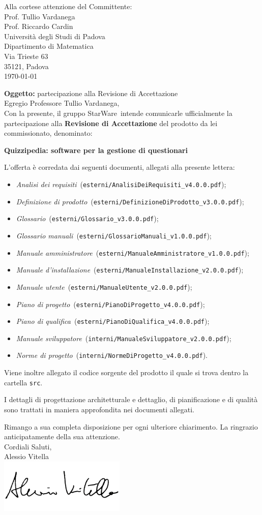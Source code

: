 \documentclass[12pt,a4paper]{article}
\title{\titoloDocumento}
\newcommand{\nomeGruppo}{StarWare}
\newcommand{\uni}{Universit\`{a} degli Studi di Padova}
\newcommand{\Cardin}{Prof. Riccardo Cardin}
\newcommand{\Vardanega}{Prof. Tullio Vardanega}
\newcommand{\prjL}{Quizzipedia: software per la gestione di questionari}
\newcommand{\AVI}{Alessio Vitella}
\newcommand{\NdP}{\emph{Norme di progetto}}
\newcommand{\AdR}{\emph{Analisi dei requisiti}}
\newcommand{\PdP}{\emph{Piano di progetto}}
\newcommand{\PdQ}{\emph{Piano di qualifica}}
\newcommand{\DP}{\emph{Definizione di prodotto}}
\newcommand{\MA}{\emph{Manuale amministratore}}
\newcommand{\MU}{\emph{Manuale utente}}
\newcommand{\MI}{\emph{Manuale d'installazione}}
\newcommand{\MS}{\emph{Manuale sviluppatore}}
\newcommand{\GL}{\emph{Glossario}}
\newcommand{\GM}{\emph{Glossario manuali}}
\newcommand{\NdPv}{\texttt{NormeDiProgetto\_v4.0.0.pdf}}
\newcommand{\AdRv}{\texttt{AnalisiDeiRequisiti\_v4.0.0.pdf}}
\newcommand{\PdPv}{\texttt{PianoDiProgetto\_v4.0.0.pdf}}
\newcommand{\PdQv}{\texttt{PianoDiQualifica\_v4.0.0.pdf}}
\newcommand{\DPv}{\texttt{DefinizioneDiProdotto\_v3.0.0.pdf}}
\newcommand{\MAv}{\texttt{ManualeAmministratore\_v1.0.0.pdf}}
\newcommand{\MUv}{\texttt{ManualeUtente\_v2.0.0.pdf}}
\newcommand{\MIv}{\texttt{ManualeInstallazione\_v2.0.0.pdf}}
\newcommand{\MSv}{\texttt{ManualeSviluppatore\_v2.0.0.pdf}}
\newcommand{\GLv}{\texttt{Glossario\_v3.0.0.pdf}}
\newcommand{\GMv}{\texttt{GlossarioManuali\_v1.0.0.pdf}}
\newcommand{\filePath}[1]{\texttt{#1}}
\begin{document}
\hspace{8cm}\begin{minipage}[t]{10cm}
	Alla cortese attenzione del Committente: \\
	\Vardanega \\
	\Cardin \\
	\uni \\
	Dipartimento di Matematica\\
	Via Trieste 63\\
	35121, Padova\\
	\today \\
\end{minipage}
\vfill

\textbf{Oggetto:} partecipazione alla Revisione di Accettazione\\

Egregio Professore Tullio Vardanega,\\
Con la presente, il gruppo \nomeGruppo\ intende comunicarle ufficialmente la partecipazione alla \textbf{Revisione di Accettazione} del prodotto da lei commissionato, denominato:
\begin{center}
	\textbf{\prjL}
\end{center}
L’offerta è corredata dai seguenti documenti, allegati alla presente lettera:

\begin{itemize}
	\item \AdR\ (\filePath{esterni/}\AdRv);
	\item \DP\ (\filePath{esterni/}\DPv);
	\item \GL\ (\filePath{esterni/}\GLv);
	\item \GM\ (\filePath{esterni/}\GMv);
	\item \MA\ (\filePath{esterni/}\MAv);
	\item \MI\ (\filePath{esterni/}\MIv);
	\item \MU\ (\filePath{esterni/}\MUv);
	\item \PdP\ (\filePath{esterni/}\PdPv);
	\item \PdQ\ (\filePath{esterni/}\PdQv);
	\item \MS\ (\filePath{interni/}\MSv);
	\item \NdP\ (\filePath{interni/}\NdPv).
\end{itemize}

Viene inoltre allegato il codice sorgente del prodotto il quale si trova dentro la cartella \texttt{src}.

I dettagli di progettazione architetturale e dettaglio, di pianificazione e di qualità sono trattati in maniera approfondita nei documenti allegati.

Rimango a sua completa disposizione per ogni ulteriore chiarimento. La ringrazio anticipatamente della sua attenzione.\\

Cordiali Saluti,\\
\AVI \\
\includegraphics[width=6cm]{../img/firmaVitella.png}
\end{document}
